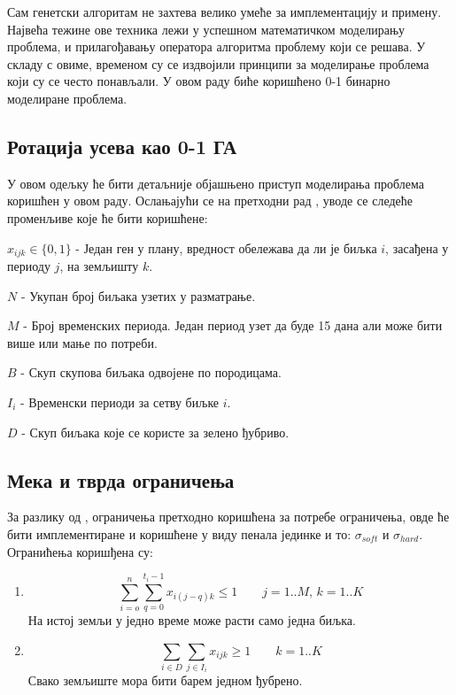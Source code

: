 \documentclass[12pt,fleqn]{article}
\begin{document}
Сам генетски алгоритам не захтева велико умеће за имплементацију и примену. Највећа тежине ове техника лежи у успешном математичком моделирању проблема, и прилагођавању оператора алгоритма проблему који се решава. У складу с овиме, временом су се издвојили принципи за моделирање проблема који су се често понављали. У овом раду биће коришћено 0-1 бинарно моделиране проблема.

\subsection{Ротација усева као 0-1 ГА}

У овом одељку ће бити детаљније објашњено приступ моделирања проблема коришћен у овом раду. Ослањајући се на претходни рад \cite{geraldi}, уводе се следеће променљиве које ће бити коришћене:

$x_{ijk} \in \{0,1\}$ - Један ген у плану, вредност обележава да ли је биљка $i$, засађена у периоду $j$, на земљишту $k$.

$N$ - Укупан број биљака узетих у разматрање.

$M$ - Број временских периода. Један период узет да буде 15 дана али може бити више или мање по потреби.

$B$ - Скуп скупова биљака одвојене по породицама.

$I_i$ - Временски периоди за сетву биљке $i$.

$D$ - Скуп биљака које се користе за зелено ђубриво.

\subsection{Мека и тврда ограничења}
За разлику од \cite{geraldi}, ограничења претходно коришћена за потребе ограничења, овде ће бити имплементиране и коришћене у виду пенала јединке и то: $\sigma_{soft}$ и $\sigma_{hard}$. Огранићења коришђена су:


\begin{enumerate}
  
\item{\[
  \sum_{i=o}^n \sum_{q=0}^{t_i-1} x_{i(j-q)k} \le 1 \qquad j = 1..M,\, k = 1..K
\] На истој земљи у једно време може расти само једна биљка.}

\item{
    \[
      \sum_{i\in D} \sum_{j\in I_i}x_{ijk} \ge 1 \qquad k = 1..K
    \] Свако земљиште мора бити барем једном ђубрено.
  }

\end{enumerate}
\end{document}
